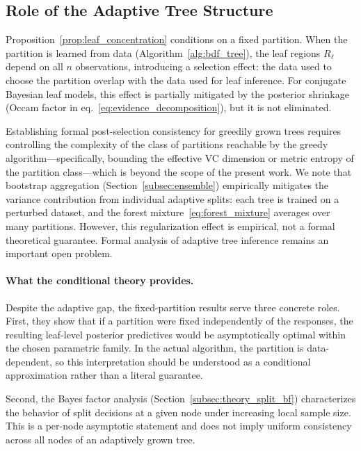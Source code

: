 \documentclass[twoside,11pt]{article}
\begin{document}
\subsection{Role of the Adaptive Tree Structure}\label{subsec:theory_adaptive_caveat}

Proposition~\ref{prop:leaf_concentration} conditions on a fixed partition. When the partition is learned from data (Algorithm~\ref{alg:bdf_tree}), the leaf regions $R_\ell$ depend on all $n$ observations, introducing a selection effect: the data used to choose the partition overlap with the data used for leaf inference. For conjugate Bayesian leaf models, this effect is partially mitigated by the posterior shrinkage (Occam factor in eq.~\eqref{eq:evidence_decomposition}), but it is not eliminated.

Establishing formal post-selection consistency for greedily grown trees requires controlling the complexity of the class of partitions reachable by the greedy algorithm---specifically, bounding the effective VC dimension or metric entropy of the partition class---which is beyond the scope of the present work. We note that bootstrap aggregation (Section~\ref{subsec:ensemble}) empirically mitigates the variance contribution from individual adaptive splits: each tree is trained on a perturbed dataset, and the forest mixture~\eqref{eq:forest_mixture} averages over many partitions. However, this regularization effect is empirical, not a formal theoretical guarantee. Formal analysis of adaptive tree inference remains an important open problem.

\paragraph{What the conditional theory provides.}
Despite the adaptive gap, the fixed-partition results serve three concrete roles. First, they show that if a partition were fixed independently of the responses, the resulting leaf-level posterior predictives would be asymptotically optimal within the chosen parametric family. In the actual algorithm, the partition is data-dependent, so this interpretation should be understood as a conditional approximation rather than a literal guarantee.

Second, the Bayes factor analysis (Section~\ref{subsec:theory_split_bf}) characterizes the behavior of split decisions at a given node under increasing local sample size. This is a per-node asymptotic statement and does not imply uniform consistency across all nodes of an adaptively grown tree.
\end{document}
